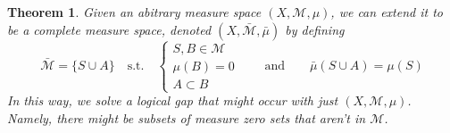 \documentclass[12pt]{article}
\theoremstyle{plain}
\newtheorem{thm}{Theorem}[subsection]
\theoremstyle{definition}
\theoremstyle{remark}
\begin{document}
\begin{thm}
Given an abitrary measure space $(X,\mathscr{M},\mu)$, we can extend it to be a \emph{complete} measure space, denoted $(X,\bar{\mathscr{M}},\bar{\mu})$ by defining
\[
    \bar{\mathscr{M}} = \{S\cup A \} 
    \quad \text{s.t.} \quad 
    \left\{
        \begin{array}{l}
        S, B\in\mathscr{M} \\
        \mu(B) = 0 \\ 
        A \subset B 
    \end{array}
    \right.
    \qquad \text{and} \qquad
    \bar{\mu}(S\cup A) = \mu(S)
\]
In this way, we solve a logical gap that might occur with just $(X,\mathscr{M},\mu)$. Namely, there might be subsets of measure zero sets that aren't in $\mathscr{M}$. 
\end{thm}
\end{document}
